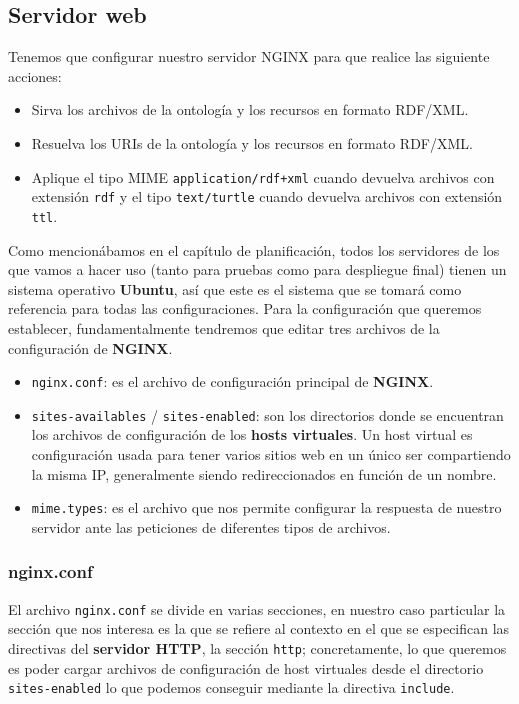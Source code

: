 \subsection{Servidor web}

Tenemos que configurar nuestro servidor {\sf NGINX} para que realice las siguiente acciones:

\begin{itemize}
	\item Sirva los archivos de la ontología y los recursos en formato {\sf RDF/XML}.
	\item Resuelva los {\sf URIs} de la ontología y los recursos en formato {\sf RDF/XML}.
	\item Aplique el tipo {\sf MIME} {\tt application/rdf+xml} cuando devuelva archivos con extensión {\tt rdf} y el tipo {\tt text/turtle} cuando devuelva archivos con extensión {\tt ttl}.
\end{itemize}

Como mencionábamos en el capítulo de planificación, todos los servidores de los que vamos a hacer uso (tanto para pruebas como para despliegue final) tienen un sistema operativo {\bf Ubuntu}, así que este es el sistema que se tomará como referencia para todas las configuraciones. Para la configuración que queremos establecer, fundamentalmente tendremos que editar tres archivos de la configuración de {\bf NGINX}.

\begin{itemize}
	\item {\tt nginx.conf}: es el archivo de configuración principal de {\bf NGINX}.
	\item {\tt sites-availables} / {\tt sites-enabled}: son los directorios donde se encuentran los archivos de configuración de los {\bf hosts virtuales}. Un host virtual es configuración usada para tener varios sitios web en un único ser compartiendo la misma IP, generalmente siendo redireccionados en función de un nombre.
	\item {\tt mime.types}: es el archivo que nos permite configurar la respuesta de nuestro servidor ante las peticiones de diferentes tipos de archivos.
\end{itemize}

\subsubsection{nginx.conf}

El archivo {\tt nginx.conf} se divide en varias secciones, en nuestro caso particular la sección que nos interesa es la que se refiere al contexto en el que se especifican las directivas del {\bf servidor HTTP}, la sección {\tt http}; concretamente, lo que queremos es poder cargar archivos de configuración de host virtuales desde el directorio {\tt sites-enabled} lo que podemos conseguir mediante la directiva {\tt include}.
\bigskip

